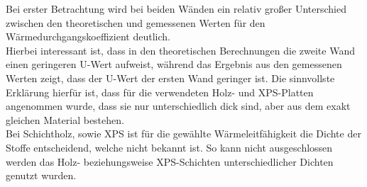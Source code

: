 Bei erster Betrachtung wird bei beiden Wänden ein relativ großer Unterschied zwischen den theoretischen und gemessenen Werten für den Wärmedurchgangskoeffizient deutlich.\\
Hierbei interessant ist, dass in den theoretischen Berechnungen die zweite Wand einen geringeren U-Wert aufweist, während das Ergebnis aus den gemessenen Werten zeigt, dass der U-Wert der ersten Wand geringer ist.
Die sinnvollste Erklärung hierfür ist, dass für die verwendeten Holz- und XPS-Platten angenommen wurde, dass sie nur unterschiedlich dick sind, aber aus dem exakt gleichen Material bestehen.\\
Bei Schichtholz, sowie XPS ist für die gewählte Wärmeleitfähigkeit die Dichte der Stoffe entscheidend, welche nicht bekannt ist.
So kann nicht ausgeschlossen werden das Holz- beziehungsweise XPS-Schichten unterschiedlicher Dichten genutzt wurden.\\
